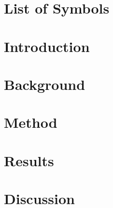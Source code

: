 \documentclass[12pt,a4paper]{article}
\begin{document}
\section*{List of Symbols}\label{ch:Symbols} 
\printglossary[type=symbols,style=long]
\clearpage

\listoffigures\label{ch:Figures} 
\clearpage

\listoftables\label{ch:Tables} 
\clearpage

\section{Introduction}\label{ch:Introduction}

\clearpage

\section{Background}\label{ch:Background}

\clearpage

\section{Method}\label{ch:Method}

\clearpage

\section{Results}\label{ch:Results}

\clearpage

\section{Discussion}\label{ch:Discussion}

\clearpage
\end{document}
